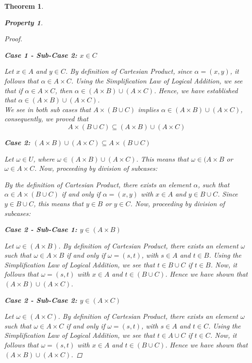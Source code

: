 \documentclass{book}
\newtheorem{theorem}{Theorem}[section]
\newtheorem{property}{Property}[theorem]
\theoremstyle{definition}
\theoremstyle{remark}
\begin{document}
\begin{theorem}
\begin{property}
\begin{proof}
                    \begin{flushleft} \textbf{Case 1 - Sub-Case 2: $x \in C$} \end{flushleft}  
                        Let $x \in A$ and $y \in C$. By definition of Cartesian Product, since $\alpha = (x,y)$, it follows that $\alpha \in A \times C$. Using the Simplification Law of Logical Addition, we see that if $\alpha \in A \times C$, then $\alpha \in (A \times B) 
                        \cup (A \times C)$. Hence, we have established that $\alpha \in (A \times B) 
                        \cup (A \times C)$. \\
                        
                We see in both sub cases that $A \times (B \cup C)$ implies $\alpha \in (A \times B) \cup (A \times C)$, consequently, we proved that $$A \times (B \cup C) \subseteq (A \times B) \cup (A \times C)$$
                
            \begin{flushleft} \textbf{Case 2: $(A \times B) \cup (A \times C) \subseteq A \times (B \cup C)$} \end{flushleft} 
                Let $\omega \in U$, where $\omega \in (A \times B) \cup (A \times C)$. This means that $\omega \in (A \times B$ or $\omega \in A \times C$. Now, proceeding by division of subcases:
                
                
                By the definition of Cartesian Product, there exists an element $\alpha$, such that $\alpha \in A \times (B \cup C)$ if and only if $\alpha = (x,y)$ with $x \in A$ and $y \in B \cup C$. Since $y \in B \cup C$, this means that $y \in B$ or $y \in C$. Now, proceeding by division of subcases:
                
                    \begin{flushleft} \textbf{Case 2 - Sub-Case 1: $y \in (A \times B)$} \end{flushleft}
                        Let $\omega \in (A \times B)$. By definition of Cartesian Product, there exists an element $\omega$ such that $\omega \in A \times B$ if and only if $\omega = (s,t)$, with $s \in A$ and $t \in B$. Using the Simplification Law of Logical Addition, we see that $t \in B \cup C$ if $t \in B$. Now, it follows that $\omega = (s,t)$ with $x \in A$ and $t \in (B \cup C)$. Hence we have shown that $(A \times B) \cup (A \times C)$. 
                    
                    \begin{flushleft} \textbf{Case 2 - Sub-Case 2: $y \in (A \times C)$} \end{flushleft}  
                        Let $\omega \in (A \times C)$. By definition of Cartesian Product, there exists an element $\omega$ such that $\omega \in A \times C$ if and only if $\omega = (s,t)$, with $s \in A$ and $t \in C$. Using the Simplification Law of Logical Addition, we see that $t \in A \cup C$ if $t \in C$. Now, it follows that $\omega = (s,t)$ with $x \in A$ and $t \in (B \cup C)$. Hence we have shown that $(A \times B) \cup (A \times C)$. 
                

\end{proof}
\end{property}
\end{theorem}
\end{document}

